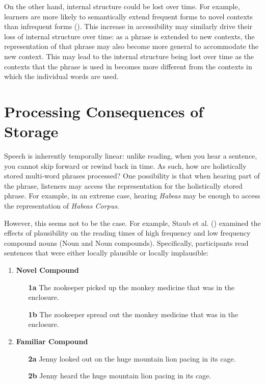 \documentclass[
  12pt,
  letterpaper,
]{scrreprt}
\begin{document}
On the other hand, internal structure could be lost over time. For
example, learners are more likely to semantically extend frequent forms
to novel contexts than infrequent forms
().
This increase in accessibility may similarly drive their loss of
internal structure over time: as a phrase is extended to new contexts,
the representation of that phrase may also become more general to
accommodate the new context. This may lead to the internal structure
being lost over time as the contexts that the phrase is used in becomes
more different from the contexts in which the individual words are used.

\section{Processing Consequences of
Storage}\label{sec-processing-consequences-of-storage}

Speech is inherently temporally linear: unlike reading, when you hear a
sentence, you cannot skip forward or rewind back in time. As such, how
are holistically stored multi-word phrases processed? One possibility is
that when hearing part of the phrase, listeners may access the
representation for the holistically stored phrase. For example, in an
extreme case, hearing \emph{Habeas} may be enough to access the
representation of \emph{Habeas Corpus}.

However, this seems not to be the case. For example, Staub et al.
() examined the
effects of plausibility on the reading times of high frequency and low
frequency compound nouns (Noun and Noun compounds). Specifically,
participants read sentences that were either locally plausible or
locally implausible:

\begin{enumerate} 

    \item \textbf{Novel Compound}
    \begin{enumerate}
        \item[\textbf{1a}] The zookeeper picked up the monkey medicine that was in the enclosure.
        \item[\textbf{1b}] The zookeeper spread out the monkey medicine that was in the enclosure.
    \end{enumerate} \label{staubsentencenovel}
    \item \textbf{Familiar Compound}
    \begin{enumerate}
        \item[\textbf{2a}] Jenny looked out on the huge mountain lion pacing in its cage. \label{familiarplaus}
        \item[\textbf{2b}] Jenny heard the huge mountain lion pacing in its cage. \label{familiarimplaus}
    \end{enumerate} \label{staubsentencefamiliar}
\end{enumerate}
\end{document}
